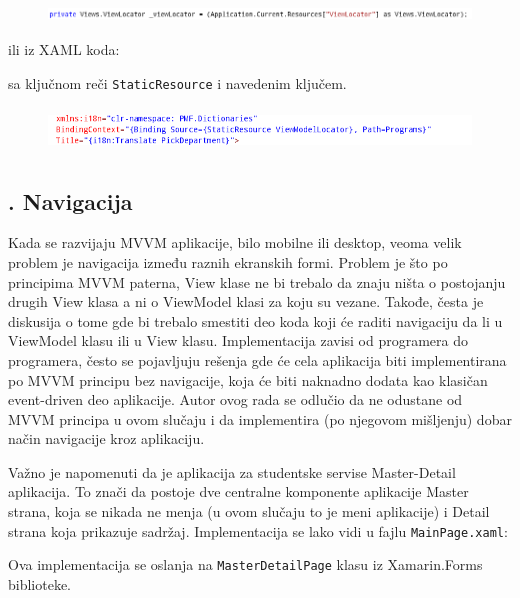 \documentclass[a4paper]{article}
\begin{document}
\begin{figure}
\centering
\includegraphics[width=170mm,height=4.41mm]{msc-img45.png}
\end{figure}
ili iz XAML koda:

sa ključnom reči \texttt{\textcolor[rgb]{0.0,0.4,0.8}{StaticResource}} i
navedenim ključem.

\begin{figure}
\centering
\includegraphics[width=170mm,height=11.92mm]{msc-img46.png}
\end{figure}
\subsection[7.6. Navigacija ]{. Navigacija }
\hypertarget{RefHeadingToc856882405265}{}Kada se razvijaju MVVM
aplikacije, bilo mobilne ili desktop, veoma velik problem je navigacija
između raznih ekranskih formi. Problem je što po principima MVVM
paterna, View klase ne bi trebalo da znaju ništa o postojanju drugih
View klasa a ni o ViewModel klasi za koju su vezane. Takođe, česta je
diskusija o tome gde bi trebalo smestiti deo koda koji će raditi
navigaciju da li u ViewModel klasu ili u View klasu. Implementacija
zavisi od programera do programera, često se pojavljuju rešenja gde će
cela aplikacija biti implementirana po MVVM principu bez navigacije,
koja će biti naknadno dodata kao klasičan event-driven deo aplikacije.
Autor ovog rada se odlučio da ne odustane od MVVM principa u ovom
slučaju i da implementira (po njegovom mišljenju) dobar način
navigacije kroz aplikaciju.

Važno je napomenuti da je aplikacija za studentske servise Master-Detail
aplikacija. To znači da postoje dve centralne komponente aplikacije
Master strana, koja se nikada ne menja (u ovom slučaju to je meni
aplikacije) i Detail strana koja prikazuje sadržaj. Implementacija se
lako vidi u fajlu \texttt{\textcolor[rgb]{0.0,0.4,0.8}{MainPage.xaml}}:

Ova implementacija se oslanja na
\texttt{\textcolor[rgb]{0.0,0.4,0.8}{MasterDetailPage}} klasu iz
Xamarin.Forms biblioteke.
\end{document}
